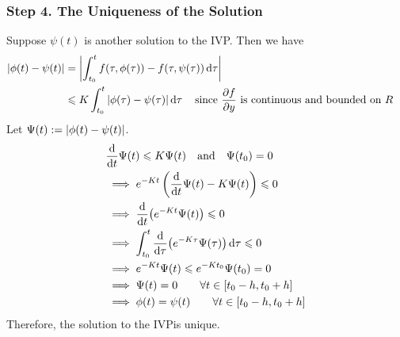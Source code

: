 \documentclass[10pt,UTF8]{article}
\theoremstyle{definition}
\newtheorem{definition inner}{Definition}[section]
\theoremstyle{definition}
\newtheorem{theorem inner}{Theorem}[section]
\theoremstyle{definition}
\newtheorem*{proof inner}{\textit{Proof}}
\theoremstyle{plain}
\newtheorem{tip inner}{Tip}[section]
\theoremstyle{remark}
\begin{document}
\subsubsection*{Step 4. The Uniqueness of the Solution}

Suppose \(\psi(t)\) is another solution to the IVP\@.
Then we have
\begin{align*}
  \abs{\phi(t) - \psi(t)}
  &= \abs{\int_{t_0}^{t} f(\tau, \phi(\tau)) - f(\tau, \psi(\tau)) \dd{\tau}} \\
  &\leqslant K \int_{t_0}^{t} \abs{\phi(\tau) - \psi(\tau)} \dd{\tau}
  \qq{since \(\displaystyle\pdv{f}{y}\) is continuous and bounded on \(R\)}
\end{align*}
Let \(\Psi(t) := \abs{\phi(t) - \psi(t)}\).
\begin{align*}
  &\dv{t} \Psi(t) \leqslant K \Psi(t)
  \qand \Psi(t_0) = 0 \\
  &\implies e^{-K t} \left(\dv{t}\Psi(t) - K \Psi(t)\right) \leqslant 0 \\
  &\implies \dv{t}(e^{-K t} \Psi(t)) \leqslant 0 \\
  &\implies \int_{t_0}^{t} \dv{\tau}(e^{-K \tau} \Psi(\tau))
  \dd{\tau} \leqslant 0 \\
  &\implies e^{-K t} \Psi(t) \leqslant e^{-K t_0} \Psi(t_0) = 0 \\
  &\implies \Psi(t) = 0 \qquad \forall t \in [t_0 - h, t_0 + h] \\
  &\implies \phi(t) = \psi(t) \qquad \forall t \in [t_0 - h, t_0 + h]
\end{align*}
Therefore, the solution to the IVP\@ is unique.
\end{document}

